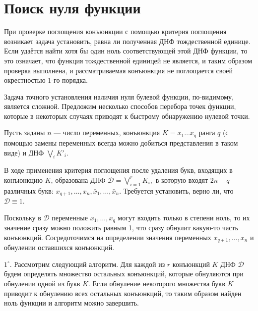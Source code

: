 \documentclass[12pt,a4paper,oneside,fleqn,leqno]{article}
\theoremstyle{definition}
\begin{document}
	\section{Поиск нуля функции}
		При проверке поглощения конъюнкции с помощью критерия поглощения возникает задача установить, равна ли полученная ДНФ тождественной единице. Если удаётся найти хотя бы один ноль соответствующей этой ДНФ функции, то это означает, что функция тождественной единицей не является, и таким образом проверка выполнена, и рассматриваемая конъюнкция не поглощается своей окрестностью 1-го порядка.\par
		Задача точного установления наличия нуля булевой функции, по-видимому, является сложной. Предложим несколько способов перебора точек функции, которые в некоторых случаях приводят к быстрому обнаружению нулевой точки.\par
		Пусть заданы $n$ --- число переменных, конъюнкция $K = x_1\ldots x_q$ ранга $q$ (с помощью замены переменных всегда можно добиться представления в таком виде) и ДНФ $\bigvee\limits_iK'_i.$\par
		В ходе применения критерия поглощения после удаления букв, входящих в конъюнкцию $K$, образована ДНФ $\mathcal{D} = \bigvee\limits_{i = 1}^rK_i,$ в которую входят $2n - q$ различных букв: $x_{q + 1},\ldots, x_n, \bar{x}_1,\ldots,\bar{x}_n$. Требуется установить, верно ли, что $\mathcal{D} \equiv 1.$\par
		Поскольку в $\mathcal{D}$ переменные $x_1,\ldots, x_q$ могут входить только в степени ноль, то их значение сразу можно положить равным 1, что сразу обнулит какую-то часть конъюнкций. Сосредоточимся на определении значения переменных $x_{q + 1},\ldots, x_n$ и обнулении оставшихся конъюнкций.\par
		$1^{\circ}.$ Рассмотрим следующий алгоритм. Для каждой из $r$ конъюнкций $K$ ДНФ $\mathcal{D}$ будем определять множество остальных конъюнкций, которые обнуляются при обнулении одной из букв $K.$ Если обнуление некоторого множества букв $K$ приводит к обнулению всех остальных конъюнкций, то таким образом найден ноль функции и алгоритм можно завершить.\par
\end{document}
